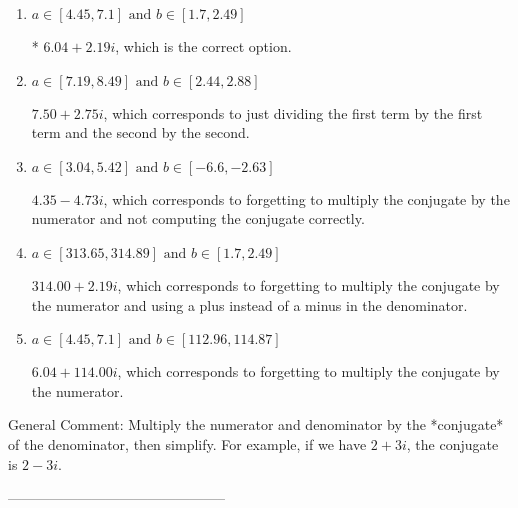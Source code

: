 \documentclass{article}[14pt]
\begin{document}
\begin{enumerate}[label=\Alph*.] 
\item $ a \in [4.45, 7.1] \text{ and } b \in [1.7, 2.49] $ 

 * $6.04  + 2.19 i$, which is the correct option. 
\item $ a \in [7.19, 8.49] \text{ and } b \in [2.44, 2.88] $ 

  $7.50  + 2.75 i$, which corresponds to just dividing the first term by the first term and the second by the second. 
\item $ a \in [3.04, 5.42] \text{ and } b \in [-6.6, -2.63] $ 

  $4.35  - 4.73 i$, which corresponds to forgetting to multiply the conjugate by the numerator and not computing the conjugate correctly. 
\item $ a \in [313.65, 314.89] \text{ and } b \in [1.7, 2.49] $ 

  $314.00  + 2.19 i$, which corresponds to forgetting to multiply the conjugate by the numerator and using a plus instead of a minus in the denominator. 
\item $ a \in [4.45, 7.1] \text{ and } b \in [112.96, 114.87] $ 

  $6.04  + 114.00 i$, which corresponds to forgetting to multiply the conjugate by the numerator. 
\end{enumerate} 
 
General Comment: Multiply the numerator and denominator by the *conjugate* of the denominator, then simplify. For example, if we have $2+3i$, the conjugate is $2-3i$.

-----------------------------------------------
\end{document}
